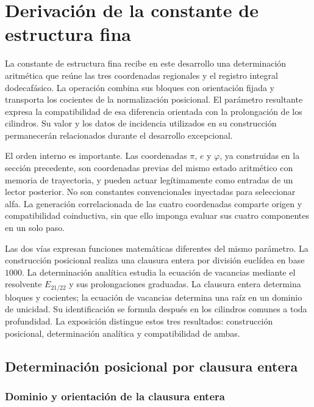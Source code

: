 \section{Derivación de la constante de estructura fina}
\label{sec:alpha}

La constante de estructura fina recibe en este desarrollo una determinación
aritmética que reúne las tres coordenadas regionales y el registro integral
dodecafásico. La operación combina sus bloques con orientación fijada y
transporta los cocientes de la normalización posicional. El parámetro
resultante expresa la compatibilidad de esa diferencia orientada con
la prolongación de los cilindros. Su valor y los datos de incidencia
utilizados en su construcción permanecerán relacionados durante el
desarrollo excepcional.

El orden interno es importante. Las coordenadas \(\pi\),
\(e\) y \(\varphi\), ya construidas en la sección precedente, son coordenadas
previas del mismo estado aritmético con memoria de trayectoria, y pueden actuar legítimamente como
entradas de un lector posterior. No son constantes convencionales
inyectadas para seleccionar alfa. La generación correlacionada de las cuatro coordenadas comparte origen y
compatibilidad coinductiva, sin que ello imponga evaluar sus cuatro
componentes en un solo paso.

Las dos vías expresan funciones matemáticas diferentes del mismo parámetro.
La construcción posicional realiza una clausura entera por división euclídea en base
\(1000\). La determinación analítica estudia la ecuación de vacancias mediante
el resolvente \(E_{21/22}\) y sus prolongaciones graduadas. La clausura entera
determina bloques y cocientes; la ecuación de vacancias determina una raíz en un
dominio de unicidad. Su identificación se formula después
en los cilindros comunes a toda profundidad. La exposición distingue
estos tres resultados: construcción posicional, determinación analítica
y compatibilidad de ambas.

\subsection{Determinación posicional por clausura entera}
\subsubsection{Dominio y orientación de la clausura entera}
\label{subsec:alpha-dominio}

